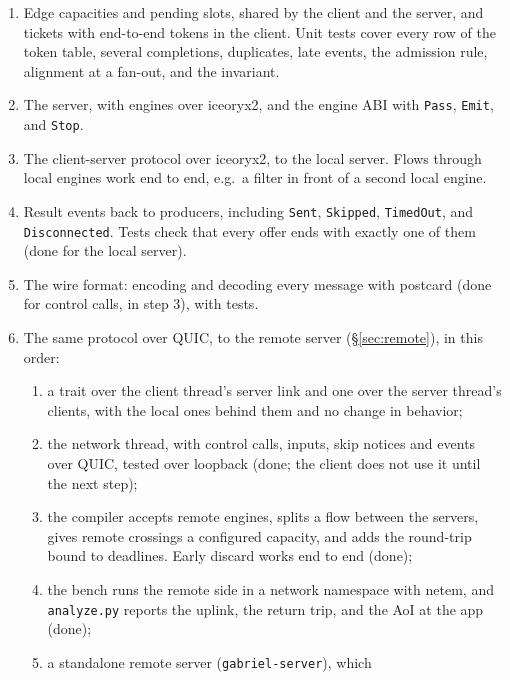 \documentclass[11pt]{article}
\newcommand{\code}[1]{\texttt{#1}}
\begin{document}
\begin{enumerate}[nosep]
  \item Edge capacities and pending slots, shared by the client and the
        server, and tickets with end-to-end tokens in the client. Unit tests
        cover every row of the token table, several completions, duplicates,
        late events, the admission rule, alignment at a fan-out, and the
        invariant.
  \item The server, with engines over iceoryx2, and the engine ABI with
        \code{Pass}, \code{Emit}, and \code{Stop}.
  \item The client-server protocol over iceoryx2, to the local server. Flows
        through local engines work end to end, e.g.\ a filter in front of a
        second local engine.
  \item Result events back to producers, including \code{Sent},
        \code{Skipped}, \code{TimedOut}, and \code{Disconnected}. Tests check
        that every offer ends with exactly one of them (done for the local
        server).
  \item The wire format: encoding and decoding every message with postcard
        (done for control calls, in step 3),
        with tests.
  \item The same protocol over QUIC, to the remote server
        (\S\ref{sec:remote}), in this order:
        \begin{enumerate}[nosep]
          \item a trait over the client thread's server link and one over
                the server thread's clients, with the local ones behind them
                and no change in behavior;
          \item the network thread, with control calls, inputs, skip notices
                and events over QUIC, tested over loopback (done; the client
                does not use it until the next step);
          \item the compiler accepts remote engines, splits a flow between
                the servers, gives remote crossings a configured capacity, and
                adds the round-trip bound to deadlines. Early discard works end
                to end (done);
          \item the bench runs the remote side in a network namespace with
                netem, and \code{analyze.py} reports the uplink, the return
                trip, and the AoI at the app (done);
          \item a standalone remote server (\code{gabriel-server}), which

\end{enumerate}
\end{enumerate}
\end{document}
